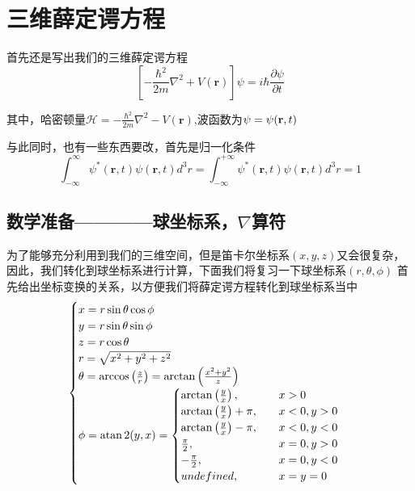\documentclass{article}
\begin{document}
\section{三维薛定谔方程}

首先还是写出我们的三维薛定谔方程
\[
	\left[-\frac{\hbar^2}{2m}\nabla^2+V(\textbf{r})\right]\psi=i\hbar\frac{\partial\psi}{\partial t}
\]

其中，哈密顿量$\displaystyle\mathcal{H}=-\frac{\hbar^2}{2m}\nabla^2-V(\textbf{r})$,波函数为$\psi=\psi(\textbf{r},t)\\$

与此同时，也有一些东西要改，首先是归一化条件
\[
	\int_{-\infty}^{\infty}\psi^*(\textbf{r},t)\psi(\textbf{r},t)d^3r=\int_{-\infty}^{+\infty}\psi^*(\textbf{r},t)\psi(\textbf{r},t)d^3r=1
\]
\subsection{数学准备————球坐标系，$\nabla$算符}
为了能够充分利用到我们的三维空间，但是笛卡尔坐标系$(x,y,z)$又会很复杂，因此，我们转化到球坐标系进行计算，下面我们将复习一下球坐标系$(r,\theta,\phi)$
首先给出坐标变换的关系，以方便我们将薛定谔方程转化到球坐标系当中
\[
	\begin{cases}
		x=r\sin\theta\cos\phi                                                        \\
		y=r\sin\theta\sin\phi                                                        \\
		z=r\cos\theta                                                                \\
		r=\sqrt{x^2+y^2+z^2}                                                         \\
		\theta=\arccos\left(\frac{z}{r}\right)=\arctan\left(\frac{x^2+y^2}{z}\right) \\
		\phi=\atan2(y,x)=
		\begin{cases}
			\arctan\left(\frac{y}{x}\right),     & \quad x>0     \\
			\arctan\left(\frac{y}{x}\right)+\pi, & \quad x<0,y>0 \\
			\arctan\left(\frac{y}{x}\right)-\pi, & \quad x<0,y<0 \\
			\frac{\pi}{2},                       & \quad x=0,y>0 \\
			-\frac{\pi}{2},                      & \quad x=0,y<0 \\
			undefined,                           & \quad x=y=0
		\end{cases}
	\end{cases}
\]
\end{document}
